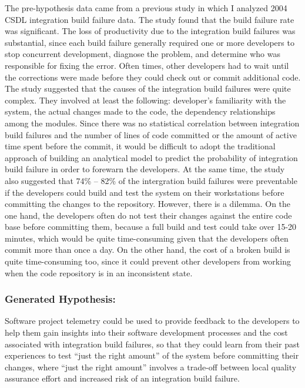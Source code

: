 The pre-hypothesis data came from a previous study in which I analyzed 2004 CSDL integration build failure data. The study found that the build failure rate was significant. The loss of productivity due to the integration build failures was substantial, since each build failure generally required one or more developers to stop concurrent development, diagnose the problem, and determine who was responsible for fixing the error. Often times, other developers had to wait until the corrections were made before they could check out or commit additional code. The study suggested that the causes of the integration build failures were quite complex. They involved at least the following: developer's familiarity with the system, the actual changes made to the code, the dependency relationships among the modules. Since there was no statistical correlation between integration build failures and the number of lines of code committed or the amount of active time spent before the commit, it would be difficult to adopt the traditional approach of building an analytical model to predict the probability of integration build failure in order to forewarn the developers. At the same time, the study also suggested that 74\% -- 82\% of the intergration build failures were preventable if the developers could build and test the system on their workstations before committing the changes to the repository. However, there is a dilemma. On the one hand,  the developers often do not test their changes against the entire code base before committing them, because a full build and test could take over 15-20 minutes, which would be quite time-consuming given that the developers often commit more than once a day. On the other hand, the cost of a broken build is quite time-consuming too, since it could prevent other developers from working when the code repository is in an inconsistent state.

\subsubsection{Generated Hypothesis:}

Software project telemetry could be used to provide feedback to the developers to help them gain insights into their software development processes and the cost associated with integration build failures, so that they could learn from their past experiences to test ``just the right amount'' of the system before committing their changes, where ``just the right amount'' involves a trade-off between local quality assurance effort and increased risk of an integration build failure.

